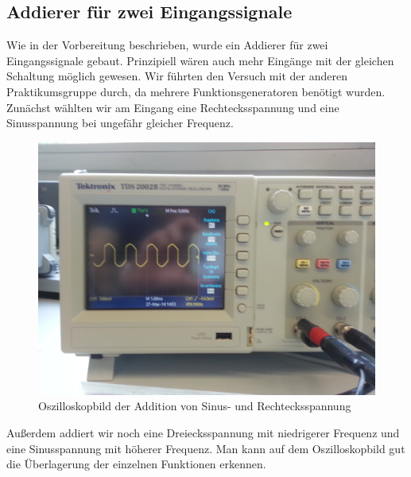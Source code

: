 \documentclass[a4paper,titlepage]{scrartcl}
\numberwithin{equation}{section}
\begin{document}
\subsection{Addierer für zwei Eingangssignale}

Wie in der Vorbereitung beschrieben, wurde ein Addierer für zwei Eingangssignale gebaut. Prinzipiell wären auch mehr Eingänge mit der gleichen Schaltung möglich gewesen. Wir führten den Versuch mit der anderen Praktikumsgruppe durch, da mehrere Funktionsgeneratoren benötigt wurden.\\
Zunächst wählten wir am Eingang eine Rechtecksspannung und eine Sinusspannung bei ungefähr gleicher Frequenz.

\begin{figure}[H]
\centering
\includegraphics[scale=.08]{bilder/aufgabe_3_2_1.jpg} 
\caption{Oszilloskopbild der Addition von Sinus- und Rechtecksspannung}
\end{figure}

Außerdem addiert wir noch eine Dreiecksspannung mit niedrigerer Frequenz und eine Sinusspannung mit höherer Frequenz. Man kann auf dem Oszilloskopbild gut die Überlagerung der einzelnen Funktionen erkennen.
\end{document}
